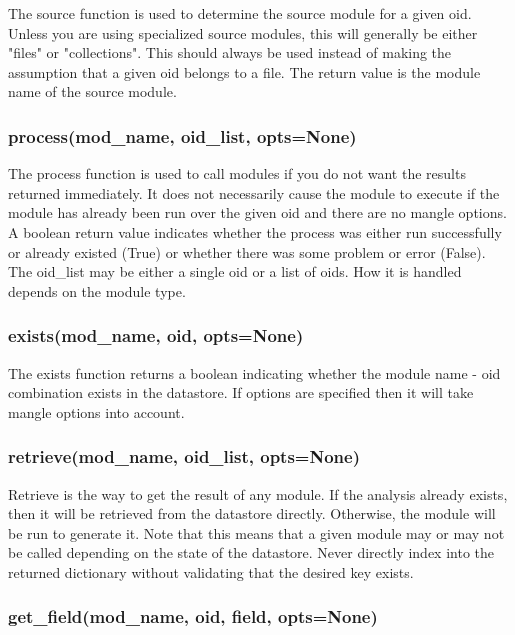 \documentclass{book}
\begin{document}
The source function is used to determine the source module for a given oid.  Unless you are using specialized source modules, this will generally be either "files" or "collections".  This should always be used instead of making the assumption that a given oid belongs to a file.  The return value is the module name of the source module.
                
\subsubsection{process(mod\_name, oid\_list, opts=None)}

The process function is used to call modules if you do not want the results returned immediately.  It does not necessarily cause the module to execute if the module has already been run over the given oid and there are no mangle options.  A boolean return value indicates whether the process was either run successfully or already existed (True) or whether there was some problem or error (False).  The oid\_list may be either a single oid or a list of oids.  How it is handled depends on the module type.
               
\subsubsection{exists(mod\_name, oid, opts=None)}

The exists function returns a boolean indicating whether the module name - oid combination exists in the datastore.  If options are specified then it will take mangle options into account.                

\subsubsection{retrieve(mod\_name, oid\_list, opts=None)}

Retrieve is the way to get the result of any module.  If the analysis already exists, then it will be retrieved from the datastore directly.  Otherwise, the module will be run to generate it.  Note that this means that a given module may or may not be called depending on the state of the datastore.  Never directly index into the returned dictionary without validating that the desired key exists.

\subsubsection{get\_field(mod\_name, oid, field, opts=None)}
\end{document}
